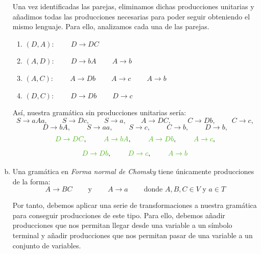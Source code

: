 \documentclass[10pt,a4paper,spanish]{report}
\begin{document}
\begin{enumerate}[a)]
Una vez identificadas las parejas, eliminamos dichas producciones unitarias y añadimos todas las producciones necesarias para poder seguir obteniendo el mismo lenguaje. Para ello, analizamos cada una de las parejas.

\begin{enumerate}[---]
  \item $(D,A): \qquad\ D \rightarrow DC$
  \item $(A,D): \qquad\ D \rightarrow bA \qquad\ A \rightarrow b$
  \item $(A,C): \qquad\ A \rightarrow Db \qquad\ A \rightarrow c \qquad\ A \rightarrow b$
  \item $(D,C): \qquad\ D \rightarrow Db \qquad\ D \rightarrow c$
\end{enumerate}

Así, nuestra gramática sin producciones unitarias sería:
\begin{displaymath}
S \rightarrow aAa, \qquad S \rightarrow Dc, \qquad S \rightarrow a, \qquad A \rightarrow DC, \qquad\ C \rightarrow Db, \qquad\ C \rightarrow c,
\end{displaymath}
\begin{displaymath}
D \rightarrow bA, \qquad\ S \rightarrow aa, \qquad\ S \rightarrow c, \qquad\ C \rightarrow b, \qquad\ D \rightarrow b,
\end{displaymath}
\begin{displaymath}
\textcolor{p9}{D \rightarrow DC}, \qquad\ \textcolor{p9}{A \rightarrow bA}, \qquad\ \textcolor{p9}{A \rightarrow Db}, \qquad\ \textcolor{p9}{A \rightarrow c},
\end{displaymath}
\begin{displaymath}
\textcolor{p9}{D \rightarrow Db}, \qquad\ \textcolor{p9}{D \rightarrow c}, \qquad\ \textcolor{p9}{A \rightarrow b}
\end{displaymath}

\item Una gramática en \textit{\textcolor{p9}{Forma normal de Chomsky}} tiene únicamente producciones de la forma:
\begin{displaymath}
  A \rightarrow BC \qquad\ \text{y} \qquad\ A \rightarrow a \qquad\ \text{donde $A,B,C \in V$ y $a \in T$}
\end{displaymath}

Por tanto, debemos aplicar una serie de transformaciones a nuestra gramática para conseguir producciones de este tipo. Para ello, debemos añadir producciones que nos permitan llegar desde una variable a un símbolo terminal y añadir producciones que nos permitan pasar de una variable a un conjunto de variables.


\end{enumerate}
\end{document}

